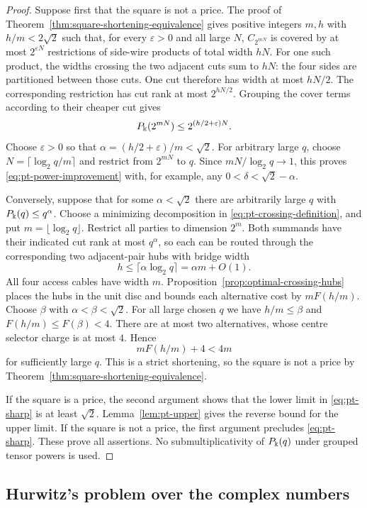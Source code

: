 \begin{proof}
Suppose first that the square is not a price. The proof of
Theorem~\ref{thm:square-shortening-equivalence} gives positive
integers $m,h$ with $h/m<2\sqrt2$ such that, for every
$\varepsilon>0$ and all large $N$, $C_{2^{mN}}$ is covered
by at most $2^{\varepsilon N}$ restrictions of side-wire
products of total width $hN$.
For one such product, the widths crossing the two adjacent
cuts sum to $hN$: the four sides are partitioned between
those cuts. One cut therefore has width at most $hN/2$.
The corresponding restriction has cut rank at most
$2^{hN/2}$. Grouping the cover terms according to their
cheaper cut gives
\[
 P_\Bbbk(2^{mN})\leq 2^{(h/2+\varepsilon)N}.
\]
Choose $\varepsilon>0$ so that
$\alpha=(h/2+\varepsilon)/m<\sqrt2$.
For arbitrary large $q$, choose
$N=\lceil\log_2q/m\rceil$ and restrict from $2^{mN}$ to $q$.
Since $mN/\log_2q\to1$, this proves
\eqref{eq:pt-power-improvement} with, for example, any
$0<\delta<\sqrt2-\alpha$.

Conversely, suppose that for some $\alpha<\sqrt2$ there are
arbitrarily large $q$ with $P_\Bbbk(q)\leq q^\alpha$.
Choose a minimizing decomposition in
\eqref{eq:pt-crossing-definition}, and put
$m=\lfloor\log_2q\rfloor$. Restrict all parties to dimension
$2^m$. Both summands have their indicated cut rank at most
$q^\alpha$, so each can be routed through the corresponding
two adjacent-pair hubs with bridge width
\[
 h\leq\lceil\alpha\log_2q\rceil=\alpha m+O(1).
\]
All four access cables have width $m$.
Proposition~\ref{prop:optimal-crossing-hubs} places the hubs
in the unit disc and bounds each alternative cost by
$mF(h/m)$. Choose $\beta$ with
$\alpha<\beta<\sqrt2$. For all large chosen $q$ we have
$h/m\leq\beta$ and $F(h/m)\leq F(\beta)<4$.
There are at most two alternatives, whose centre selector
charge is at most $4$. Hence
\[
 mF(h/m)+4<4m
\]
for sufficiently large $q$. This is a strict shortening,
so the square is not a price by
Theorem~\ref{thm:square-shortening-equivalence}.

If the square is a price, the second argument shows that
the lower limit in \eqref{eq:pt-sharp} is at least $\sqrt2$.
Lemma~\ref{lem:pt-upper} gives the reverse bound for the upper
limit. If the square is not a price, the first argument
precludes \eqref{eq:pt-sharp}. These prove all assertions.
No submultiplicativity of $P_\Bbbk(q)$ under grouped tensor
powers is used.
\end{proof}

\subsection{Hurwitz's problem over the complex numbers}

